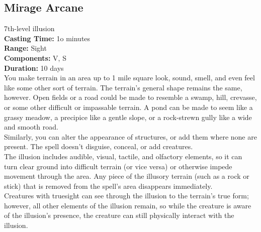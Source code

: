 \documentclass[11pt, A4paper, english]{article}
\begin{document}
		\subsection{Mirage Arcane}
7th-level illusion \\
\textbf{Casting Time:} 1o minutes \\
\textbf{Range:} Sight \\
\textbf{Components:} V, S \\
\textbf{Duration:} 10 days \\
You make terrain in an area up to 1 mile square look, sound, smell, and even feel like some other sort of terrain. The terrain’s general shape remains the same, however. Open fields or a road could be made to resemble a swamp, hill, crevasse, or some other difficult or impassable terrain. A pond can be made to seem  like a grassy meadow, a precipice like a gentle slope, or a rock-strewn gully like a wide and smooth road. \\
Similarly, you can alter the appearance of structures, or add them where none are present. The spell doesn’t disguise, conceal, or add creatures. \\
The illusion includes audible, visual, tactile, and olfactory elements, so it can turn clear ground into difficult terrain (or vice versa) or otherwise impede movement through the area. Any piece of the illusory terrain (such as a rock or stick) that is removed from the spell’s area disappears immediately. \\
Creatures with truesight can see through the illusion to the terrain’s true form; however, all other elements of the illusion remain, so while the creature is aware of the illusion’s presence, the creature can still physically interact with the illusion.
\end{document}

